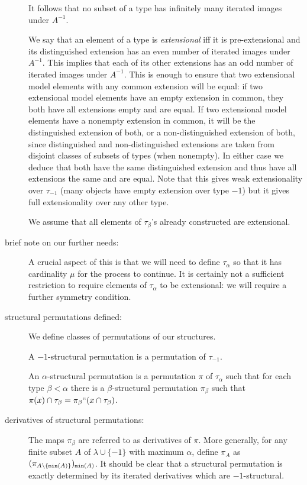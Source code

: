 \documentclass[112pt]{article}
\begin{document}
\begin{description}
  It follows that no subset of a type has
infinitely many iterated images under $A^{-1}$.



We say that an element of a type is {\em extensional\/} iff
it is pre-extensional and its distinguished extension has an even number of iterated images under $A^{-1}$.
This implies that each of its other extensions has an odd number of iterated images under $A^{-1}$.  This is enough to ensure that two extensional model elements with any common extension will be equal:  if two extensional model elements have an empty extension in common, they both have all extensions empty and are equal.  If two extensional model elements have a nonempty extension in common, it will be the distinguished extension of both, or a non-distinguished extension of both, since distinguished and non-distinguished extensions are taken from disjoint classes of subsets of types (when nonempty).
In either case we deduce that both have the same distinguished extension and thus have all extensions the same and are equal.  Note that this gives weak extensionality over $\tau_{-1}$ (many objects have empty extension over type $-1$) but it gives full extensionality over any other type.

We assume that all elements of $\tau_\beta$'s already constructed are extensional.

\item[brief note on our further needs:]  A crucial aspect of this is that we will need to define $\tau_\alpha$ so that it has cardinality $\mu$ for the process to continue.  It is certainly not a sufficient restriction to require elements of $\tau_\alpha$ to be extensional:  we will require a further symmetry condition.

\item[structural permutations defined:]  We define classes of permutations of our structures.

A $-1$-structural permutation is a permutation of $\tau_{-1}$.

An $\alpha$-structural permutation is a permutation $\pi$ of $\tau_\alpha$ such that for each type $\beta<\alpha$ there is a $\beta$-structural permutation
$\pi_\beta$ such that $\pi(x) \cap \tau_\beta = \pi_\beta``(x \cap \tau_\beta)$.

\item[derivatives of structural permutations:]  The maps $\pi_\beta$ are referred to as derivatives of $\pi$.  More generally, for any finite subset $A$ of $\lambda \cup \{-1\}$ with maximum $\alpha$,
define $\pi_A$ as $(\pi_{A \setminus \{{\tt min}(A)\}})_{{\tt min}(A)}$.  It should be clear that a structural permutation is exactly determined by its iterated derivatives which are $-1$-structural.


\end{description}
\end{document}
